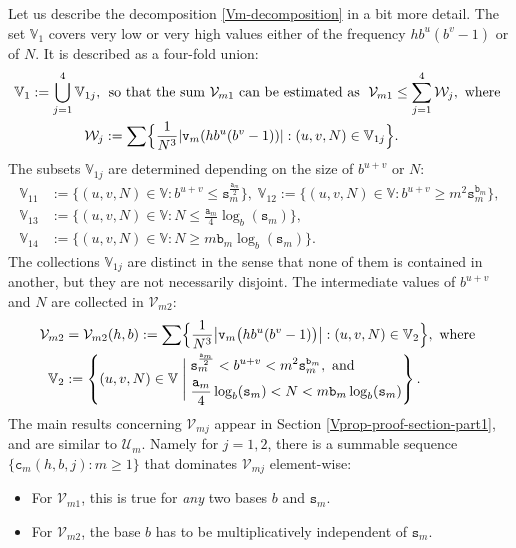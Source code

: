\documentclass[12pt, twoside]{article}
\theoremstyle{definition}
\numberwithin{equation}{section}
\begin{document}
\vskip0.1in 
\noindent Let us describe the decomposition \eqref{Vm-decomposition} in a bit more detail. The set $\mathbb V_1$ covers very low or very high values either of the frequency $hb^{u}(b^v-1)$ or of $N$. It is described as a four-fold union: 
\begin{align} 
\mathbb V_1 := \bigcup_{j=1}^{4} \mathbb V_{1j}, \; &\text{ so that the sum $\mathcal V_{m1}$ can be estimated as } \;  \mathcal V_{m1} \leq \sum_{j=1}^{4} \mathcal W_j, \text{ where } \label{sum-of-W} \\ \mathcal W_{j} &:= \sum \Bigl\{\frac{1}{N^3}|\mathtt v_m(h b^u(b^v-1))| : (u, v, N) \in \mathbb V_{1j} \Bigr\}.
\label{Wj} \end{align} 
The subsets $\mathbb V_{1j}$ are determined depending on the size of $b^{u+v}$ or $N$:
\begin{align} 
\mathbb V_{11} &:= \bigl\{(u, v, N) \in \mathbb V: b^{u+v} \leq \mathtt s_m^{\frac{\mathtt a_m}{2}}\bigr\}, \; 
\mathbb V_{12} := \bigl\{(u, v, N) \in \mathbb V : b^{u+v} \geq m^2 \mathtt s_m^{\mathtt b_m}\bigr\}, \nonumber\\
\mathbb V_{13} &:=  \bigl\{(u, v, N) \in \mathbb V : N \leq \frac{\mathtt a_m}{4} \log_{b} (\mathtt s_m) \bigr\}, \nonumber\\
\mathbb V_{14} &:= \bigl\{ (u, v, N) \in \mathbb V : N \geq m \mathtt b_m \log_{b} (\mathtt s_m) \bigr\}.
\end{align}
The collections $\mathbb V_{1j}$ are distinct in the sense that none of them is contained in another, but they are not necessarily disjoint. The intermediate values of $b^{u+v}$ and $N$ are collected in $\mathcal V_{m2}$:
\begin{align} 
\mathcal V_{m2} &= \mathcal V_{m2}(h, b) := \sum \Bigl\{\frac{1}{N^{3}} \bigl| \mathtt v_m \bigl(h b^u(b^v-1)\bigr) \bigr| : (u, v, N) \in \mathbb V_2 \Bigr\}, \text{ where } \label{Vm2-sum-definition} \\  
\mathbb V_2 &:= \left\{(u, v, N) \in \mathbb V \; \Biggl| \; \begin{aligned} &\mathtt s_m^{\frac{\mathtt a_m}{2}} < b^{u+v} < m^2 \mathtt s_m^{\mathtt b_m}, \text{ and } \\  
& \frac{\mathtt a_m}{4} \log_{b} (\mathtt s_m) < N < m \mathtt b_m \log_{b} (\mathtt s_m)
\end{aligned}  \right\}. \label{def-collection-V2}
\end{align} 
The main results concerning $\mathcal V_{mj}$ appear in Section \ref{Vprop-proof-section-part1}, and are similar to $\mathcal U_m$. Namely for $j=1,2$, there is a summable sequence $\{\mathtt c_m(h, b, j) : m \geq 1\}$ that dominates $\mathcal V_{mj}$ element-wise: 
\begin{itemize} 
\item For $\mathcal V_{m1}$, this is true for {\em{any}} two bases $b$ and $\mathtt s_m$. 
\item For $\mathcal V_{m2}$, the base $b$ has to be multiplicatively independent of $\mathtt s_m$. 
\end{itemize} 
\end{document}

